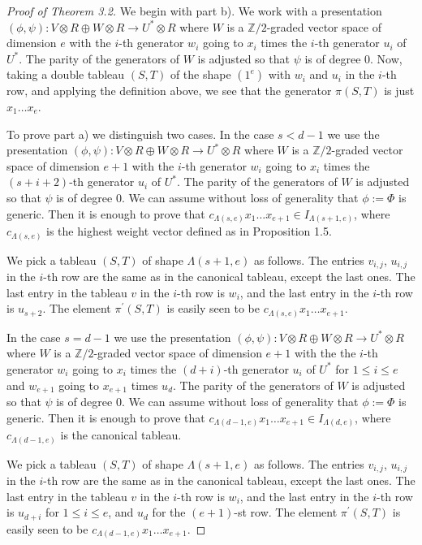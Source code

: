\documentclass{tran-l}
\theoremstyle{plain}
\theoremstyle{remark}
\theoremstyle{definition}
\newcommand{\ZZ}{\mathbb {Z}}
\begin{document}
\begin{proof}[Proof of Theorem \textup{3.2}]  We begin with part b).  We work
with a presentation  $(\phi ,\psi ):V\otimes R\oplus W\otimes R\rightarrow
U^{*}\otimes R$  where $W$ is a $\ZZ /2$-graded vector space of dimension $e$
with the $i$-th generator $w_{i}$ going to $x_{i}$ times the $i$-th generator
$u_{i}$ of $U^{*}$. The parity of the generators of $W$ is adjusted so that
$\psi $ is of degree $0$. Now, taking a double tableau $ (S, T)$ of the shape
$(1^{e})$ with $w_{i}$ and $u_{i}$ in the $i$-th row, and applying the
definition above, we see that the generator $\pi (S, T)$ is just $x_{1}\ldots
x_{e}$.

To prove part a) we distinguish two cases. In the case $s<d-1$ we use the
presentation $(\phi ,\psi ) :V\otimes R\oplus W\otimes R\rightarrow
U^{*}\otimes R$ where $W$ is a $\ZZ /2$-graded vector space of dimension $e+1$
with the $i$-th generator $w_{i}$ going to $x_{i}$ times the $(s+i+2)$-th
generator $u_{i}$ of $U^{*}$.  The parity of the generators of $W$ is adjusted
so that $\psi $ is of degree $0$. We can assume without loss of generality that
$\phi :=\Phi $ is generic. Then it is enough to prove that $c_{\Lambda
(s,e)}x_{1} \ldots x_{e+1}\in I_{\Lambda (s+1,e)}$, where $c_{\Lambda (s,e)}$
is the highest weight vector defined as in Proposition 1.5.

We pick a tableau $(S, T)$ of shape $\Lambda (s+1,e )$ as follows. The
entries $v_{i,j}$, $u_{i,j}$ in the $i$-th row are the same as in the
canonical tableau, except the last ones. The last entry in the tableau
$v$ in the $i$-th row is $w_{i}$, and the last entry in the $i$-th row
is $u_{s+2}$. The element $\pi ^{\prime }(S, T)$ is easily seen to be
$c_{\Lambda (s,e)}x_{1} \ldots x_{e+1}$.

In the case $s=d-1$ we use the presentation $(\phi ,\psi ) :V\otimes R\oplus
W\otimes R\rightarrow U^{*}\otimes R$ where $W$ is a $\ZZ /2$-graded vector
space of dimension $e+1$ with the the $i$-th generator $w_{i}$ going to $x_{i}$
times the $(d+i)$-th generator $u_{i}$ of $U^{*}$ for $1\le i\le e$ and
$w_{e+1}$ going to $x_{e+1}$ times $u_{d}$. The parity of the generators of $W$
is adjusted so that $\psi $ is of degree $0$. We can assume without loss of
generality that $\phi :=\Phi $ is generic. Then it is enough to prove that
$c_{\Lambda (d-1,e)}x_{1} \ldots x_{e+1}\in I_{\Lambda (d,e)}$, where
$c_{\Lambda (d-1,e)}$ is the canonical tableau.

We pick a tableau $(S, T)$ of shape $\Lambda (s+1,e )$ as follows. The entries
$v_{i,j}$, $u_{i,j}$ in the $i$-th row are the same as in the canonical
tableau, except the last ones. The last entry in the tableau $v$ in the $i$-th
row is $w_{i}$, and the last entry in the $i$-th row is $u_{d+i}$ for $1\le
i\le e$, and $u_{d}$ for the $(e+1)$-st row. The element $\pi ^{\prime }(S, T)$
is easily seen to be $c_{\Lambda (d-1,e)}x_{1} \ldots x_{e+1}$. 
\end{proof}
\end{document}
